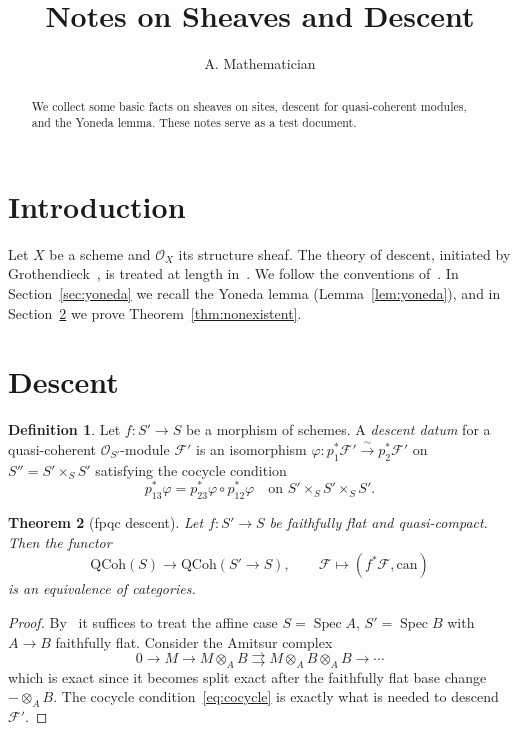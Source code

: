 \documentclass[11pt]{amsart}
\title{Notes on Sheaves and Descent}
\author{A. Mathematician}
\newtheorem{theorem}{Theorem}[section]
\theoremstyle{definition}
\newtheorem{definition}[theorem]{Definition}
\theoremstyle{remark}
\newcommand{\Spec}{\operatorname{Spec}}
\newcommand{\cO}{\mathcal{O}}
\newcommand{\cF}{\mathcal{F}}
\begin{document}
\maketitle

\begin{abstract}
We collect some basic facts on sheaves on sites, descent for quasi-coherent
modules, and the Yoneda lemma. These notes serve as a test document.
\end{abstract}

\tableofcontents

\section{Introduction}\label{sec:intro}
Let $X$ be a scheme and $\cO_X$ its structure sheaf. The theory of descent,
initiated by Grothendieck~\cite{SGA1}, is treated at length in~\cite{Vistoli}.
We follow the conventions of~\cite{Stacks}. In Section~\ref{sec:yoneda} we
recall the Yoneda lemma (Lemma~\ref{lem:yoneda}), and in
Section~\ref{sec:descent} we prove Theorem~\ref{thm:nonexistent}.



\section{Descent}\label{sec:descent}
\begin{definition}\label{def:descent-datum}
Let $f\colon S'\to S$ be a morphism of schemes. A \emph{descent datum} for a
quasi-coherent $\cO_{S'}$-module $\cF'$ is an isomorphism
$\varphi\colon p_1^*\cF'\xrightarrow{\sim}p_2^*\cF'$ on $S''=S'\times_S S'$
satisfying the cocycle condition
\begin{equation}\label{eq:cocycle}
p_{13}^*\varphi = p_{23}^*\varphi\circ p_{12}^*\varphi
\quad\text{on } S'\times_S S'\times_S S'.
\end{equation}
\end{definition}

\begin{theorem}[fpqc descent]\label{thm:fpqc}
Let $f\colon S'\to S$ be faithfully flat and quasi-compact. Then the functor
\[
\mathrm{QCoh}(S)\longrightarrow \mathrm{QCoh}(S'\to S),\qquad
\cF\longmapsto (f^*\cF,\mathrm{can})
\]
is an equivalence of categories.
\end{theorem}

\begin{proof}
By~\cite[Tag 023N]{Stacks} it suffices to treat the affine case
$S=\Spec A$, $S'=\Spec B$ with $A\to B$ faithfully flat. Consider the
Amitsur complex
\begin{equation}\label{eq:amitsur}
0\to M\to M\otimes_A B\rightrightarrows M\otimes_A B\otimes_A B
\to\cdots
\end{equation}
which is exact since it becomes split exact after the faithfully flat base
change $-\otimes_A B$. The cocycle condition~\eqref{eq:cocycle} is exactly
what is needed to descend $\cF'$.
\end{proof}
\end{document}
